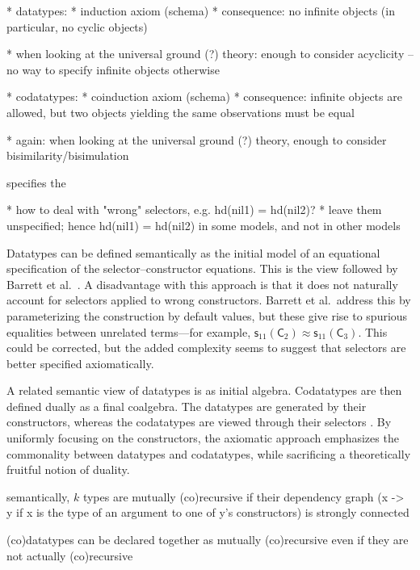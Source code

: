 \documentclass[a4paper,oribibl,envcountsame,draft]{llncs}
\newcommand\const[1]{\textsf{#1}}
\newcommand{\teq}{\approx}
\begin{document}
    * datatypes:
      * induction axiom (schema)
        * consequence: no infinite objects (in particular, no cyclic objects)

      * when looking at the universal ground (?) theory:
        enough to consider acyclicity -- no way to specify infinite objects
        otherwise

    * codatatypes:
      * coinduction axiom (schema)
        * consequence: infinite objects are allowed, but
          two objects yielding the same observations must be equal

      * again: when looking at the universal ground (?) theory, enough to
        consider bisimilarity/bisimulation

specifies the 



  * how to deal with "wrong" selectors, e.g.
        hd(nil1) = hd(nil2)?
      * leave them unspecified; hence hd(nil1) = hd(nil2) in some models,
        and not in other models




Datatypes can be defined semantically as the initial model of an equational
specification of the selector--constructor equations. This is the view followed
by Barrett et al.\ \cite{barrett-et-al-2010}. A disadvantage with this approach
is that it does not naturally account for selectors applied to wrong
constructors. Barrett et al.\ address this by parameterizing the construction by
default values, but these give rise to spurious equalities between unrelated
terms---for example, $\const{s}_{11}(\const{C}_2) \teq \const{s}_{11}(\const{C}_3)$.
This could be corrected, but the added
complexity seems to suggest that selectors are better specified axiomatically.

A related semantic view of datatypes is as initial algebra. Codatatypes are then
defined dually as a final coalgebra. The datatypes are generated by their
constructors, whereas the codatatypes are viewed through their selectors
\cite{xxx}. By uniformly focusing on the constructors, the axiomatic approach
emphasizes the commonality between datatypes and codatatypes, while sacrificing
a theoretically fruitful notion of duality.


    semantically, $k$ types are mutually (co)recursive if their dependency graph
    (x -> y if x is the type of an argument to one of y's constructors) is
    strongly connected

    (co)datatypes can be declared together as mutually (co)recursive even if
    they are not actually (co)recursive
\end{document}

